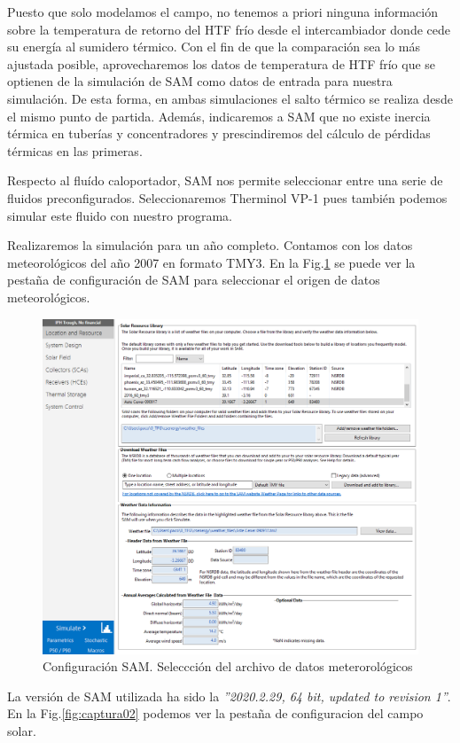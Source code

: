 Puesto que solo modelamos el campo, no tenemos a priori ninguna información sobre la temperatura de retorno del HTF frío desde el intercambiador donde cede su energía al sumidero térmico. Con el fin de que la comparación sea lo más ajustada posible, aprovecharemos los datos de temperatura de HTF frío que se optienen de la simulación de SAM como datos de entrada para nuestra simulación. De esta forma, en ambas simulaciones el salto térmico se realiza desde el mismo punto de partida. Además, indicaremos a SAM que no existe inercia térmica en tuberías y concentradores y prescindiremos del cálculo de pérdidas térmicas en las primeras.

Respecto al fluído caloportador, SAM nos permite seleccionar entre una serie de fluidos preconfigurados. Seleccionaremos Therminol VP-1 pues también podemos simular este fluido con nuestro programa.

Realizaremos la simulación para un año completo. Contamos con los datos meteorológicos del año 2007 en formato TMY3.  En la Fig.\ref{fig:captura01} se puede ver la pestaña de configuración de SAM para seleccionar el origen de datos meteorológicos.

\begin{figure}[!h]
\includegraphics[width=0.9\linewidth]{images/captura_sam_iph01.png}
\caption{Configuración SAM. Seleccción del archivo de datos meterorológicos} 
\label{fig:captura01}
\end{figure}


La versión de SAM utilizada ha sido la \emph{''2020.2.29, 64 bit, updated to revision 1''}. En la Fig.\ref{fig:captura02} podemos ver la pestaña de configuracion del campo solar. 

